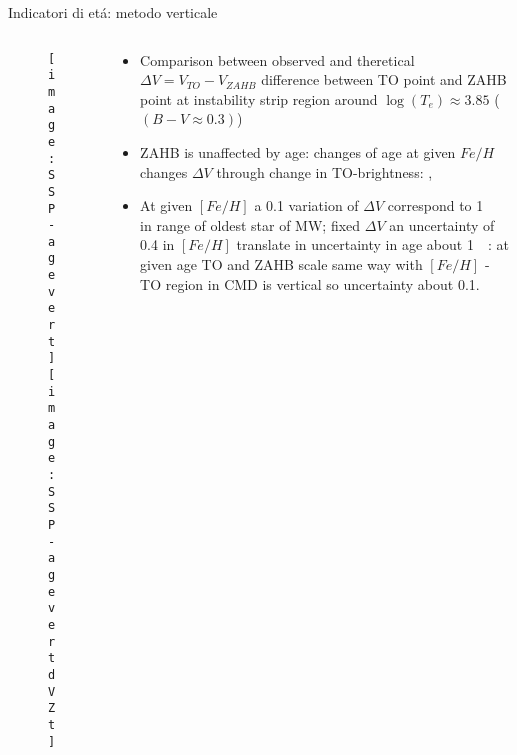 \begin{frame}{Indicatori di et\'a: metodo verticale}
\begin{columns}[T]
	\begin{column}{0.45\textwidth}
	\begin{figure}[!ht]
	\texttt{[image: SSP-agevert]}\label{fig:SSP-agevert}
	\texttt{[image: SSP-agevertdVZt]}\label{fig:SSP-agevertdVZt}
	\end{figure}
	\end{column}
	\begin{column}{0.55\textwidth}
	\begin{itemize}
	\item Comparison between observed and theretical $\Delta V=V_{TO}-V_{ZAHB}$ difference between TO point and ZAHB point at instability strip region around $\log(T_e)\approx3.85$ ($(B-V\approx0.3)$)
	\item ZAHB is unaffected by age: changes of age at given $Fe/H$ changes $\Delta V$ through change in TO-brightness: , 
	\item At given $[Fe/H]$ a \SI{0.1}{\mag} variation of $\Delta V$ correspond to \SI{1}{\giga\year} in range of oldest star of MW; fixed $\Delta V$ an uncertainty of \SI{0.4}{\dex} in $[Fe/H]$ translate in uncertainty in age about \SI{1}{\giga\year}: at given age TO and ZAHB scale  same way with $[Fe/H]$ - TO region in CMD is vertical so uncertainty about \SI{0.1}{\mag}.
	\end{itemize}
	\end{column}
\end{columns}
\end{frame}


